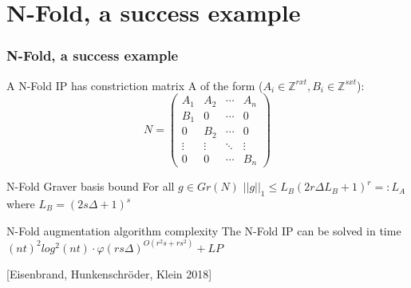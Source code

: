 \documentclass{beamer}
\begin{document}
    \section{N-Fold, a success example}
    \begin{frame}
        \frametitle{N-Fold, a success example}
        
        A N-Fold IP has constriction matrix A of the form ($A_i \in \mathbb{Z}^{rxt}, B_i \in \mathbb{Z}^{sxt}$):\\
        \begin{equation*}
        N = 
        \begin{pmatrix}
        A_1 & A_2 & \cdots & A_n \\
        B_1 & 0   & \cdots & 0 \\
        0   & B_2 & \cdots & 0 \\
        \vdots    & \vdots & \ddots & \vdots  \\
        0   & 0   & \cdots & B_n 
        \end{pmatrix}
        \end{equation*}
        
        
        \begin{block}{N-Fold Graver basis bound}
            For all $g \in Gr(N)$ $||g||_1 \leq L_B (2r\Delta L_B + 1)^r =: L_A$ where $L_B = (2s \Delta + 1)^s$
        \end{block}
        \begin{block}{N-Fold augmentation algorithm complexity}
            The N-Fold IP can be solved in time $(nt)^2 log^2(nt) \cdot \varphi (rs\Delta)^{O(r^2s + rs^2)} + LP$
        \end{block}
        
        [Eisenbrand, Hunkenschröder, Klein 2018]
    \end{frame}
    
\end{document}
